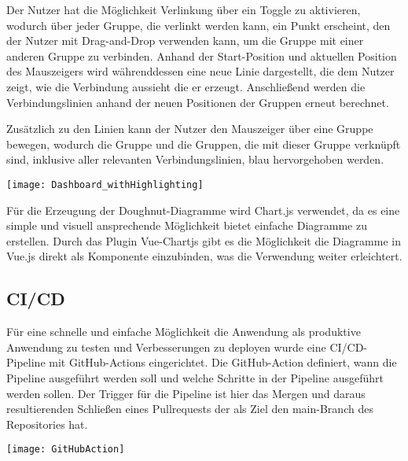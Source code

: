 Der Nutzer hat die Möglichkeit Verlinkung über ein Toggle zu aktivieren, wodurch über jeder Gruppe, die verlinkt werden kann, ein Punkt erscheint, den der Nutzer mit Drag-and-Drop verwenden kann, um die Gruppe mit einer anderen Gruppe zu verbinden.
Anhand der Start-Position und aktuellen Position des Mauszeigers wird währenddessen eine neue Linie dargestellt, die dem Nutzer zeigt, wie die Verbindung aussieht die er erzeugt. Anschließend werden die Verbindungslinien anhand der neuen Positionen der Gruppen erneut berechnet.

Zusätzlich zu den Linien kann der Nutzer den Mauszeiger über eine Gruppe bewegen, wodurch die Gruppe und die Gruppen, die mit dieser Gruppe verknüpft sind, inklusive aller relevanten Verbindungslinien, blau hervorgehoben werden.

\vspace{20pt}
\begin{center}
    \begin{minipage}{1\linewidth}
        \texttt{[image: Dashboard\_withHighlighting]}
    \end{minipage}
\end{center}
\vspace{20pt}

Für die Erzeugung der Doughnut-Diagramme wird Chart.js verwendet, da es eine simple und visuell ansprechende Möglichkeit bietet einfache Diagramme zu erstellen. Durch das Plugin Vue-Chartjs gibt es die Möglichkeit die Diagramme in Vue.js direkt als Komponente einzubinden, was die Verwendung weiter erleichtert.

\subsection{CI/CD}
Für eine schnelle und einfache Möglichkeit die Anwendung als produktive Anwendung zu testen und Verbesserungen zu deployen wurde eine CI/CD-Pipeline mit GitHub-Actions eingerichtet. Die GitHub-Action definiert, wann die Pipeline ausgeführt werden soll und welche Schritte in der Pipeline ausgeführt werden sollen. Der Trigger für die Pipeline ist hier das Mergen und daraus resultierenden Schließen eines Pullrequests der als Ziel den main-Branch des Repositories hat.

\vspace{20pt}
\begin{center}
    \begin{minipage}{1\linewidth}
        \texttt{[image: GitHubAction]}
    \end{minipage}
\end{center}
\vspace{20pt}

